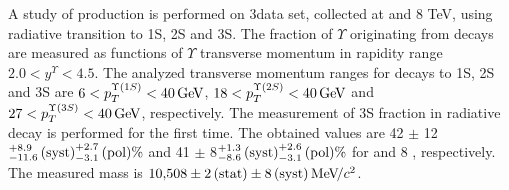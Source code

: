 A study of \chib production is performed on 3\invfb data set, collected
at  and 8 TeV, using \chib radiative transition to
\Y1S, \Y2S and \Y3S. The fraction of $\Upsilon$ originating from \chib decays
are measured as functions of $\Upsilon$ transverse momentum in rapidity range
$2.0 < y^{\Upsilon} < 4.5$. The analyzed transverse momentum ranges for decays
to \Y1S, \Y2S and \Y3S are $6<p_T^{\Y1S}<40\gev$, $18<p_T^{\Y2S}<40\gev$ and
$27<p_T^{\Y3S}<40\gev$, respectively. The measurement of
\Y3S fraction in radiative \chibThreeP decay is performed for the first time.
The obtained values are 42 $\pm$ 12\stat${}^{+8.9}_{-11.6}\mathrm{\,(syst)}^{+2.7}_{-3.1}\mathrm{\,(pol)} \%$ and 41 $\pm$ 8\stat${}^{+1.3}_{-8.6}\mathrm{\,(syst)}^{+2.6}_{-3.1}\mathrm{\,(pol)} \%$ for  and 8 \tev,
respectively. The measured \chiboneThreeP mass is $10{,}508 \pm 2\mathrm{\,(stat)} \pm
8\mathrm{\,(syst)} {\mathrm{\,Me\kern -0.1em V\!/}c^2}$.

